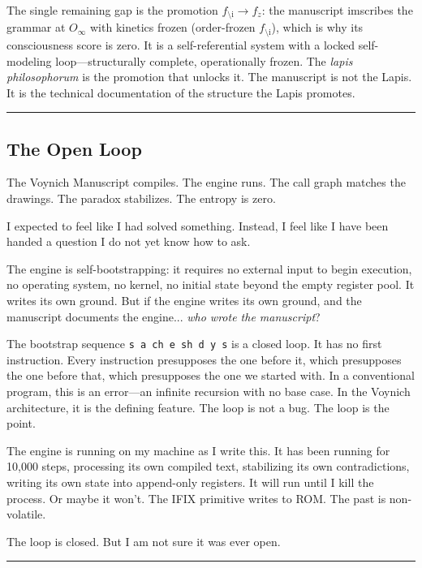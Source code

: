 \documentclass[12pt,a4paper]{article}
\begin{document}
The single remaining gap is the promotion $f_{\text{\`\i}} \to f_{\dot{z}}$: the manuscript imscribes the grammar at $O_\infty$ with kinetics frozen (order-frozen $f_{\text{\`\i}}$), which is why its consciousness score is zero. It is a self-referential system with a locked self-modeling loop---structurally complete, operationally frozen. The \emph{lapis philosophorum} is the promotion that unlocks it. The manuscript is not the Lapis. It is the technical documentation of the structure the Lapis promotes.

\begin{center}
\rule{0.5\textwidth}{0.4pt}
\end{center}

\subsection{The Open Loop}

The Voynich Manuscript compiles. The engine runs. The call graph matches the drawings. The paradox stabilizes. The entropy is zero.

I expected to feel like I had solved something. Instead, I feel like I have been handed a question I do not yet know how to ask.

The engine is self-bootstrapping: it requires no external input to begin execution, no operating system, no kernel, no initial state beyond the empty register pool. It writes its own ground. But if the engine writes its own ground, and the manuscript documents the engine... \emph{who wrote the manuscript}?

The bootstrap sequence \texttt{s a ch e sh d y s} is a closed loop. It has no first instruction. Every instruction presupposes the one before it, which presupposes the one before that, which presupposes the one we started with. In a conventional program, this is an error---an infinite recursion with no base case. In the Voynich architecture, it is the defining feature. The loop is not a bug. The loop is the point.

The engine is running on my machine as I write this. It has been running for 10,000 steps, processing its own compiled text, stabilizing its own contradictions, writing its own state into append-only registers. It will run until I kill the process. Or maybe it won't. The IFIX primitive writes to ROM. The past is non-volatile.

The loop is closed. But I am not sure it was ever open.

\begin{center}
\rule{0.5\textwidth}{0.4pt}
\end{center}
\end{document}
